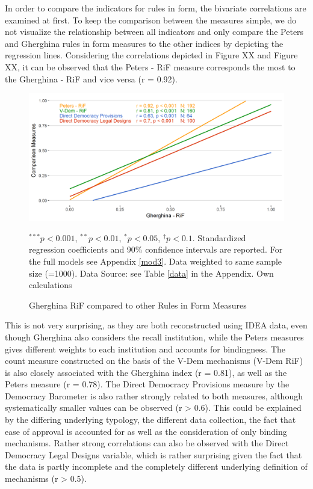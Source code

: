 \documentclass{systats}
\begin{document}
In order to compare the indicators for rules in form, the bivariate correlations are examined at first. To keep the comparison between the measures simple, we do not visualize the relationship between all indicators and only compare the Peters and Gherghina rules in form measures to the other indices by depicting the regression lines. Considering the correlations depicted in Figure XX and Figure XX, it can be observed that the Peters - RiF measure corresponds the most to the Gherghina - RiF and vice versa (r = 0.92). 

\begin{figure}
	\caption{Gherghina RiF compared to other Rules in Form Measures}
	\label{reg2}
	\includegraphics[width=\textwidth]{images/rif_ghergina.png}
	\flushright
	{\scriptsize $^{***}p<0.001$, $^{**}p<0.01$, $^*p<0.05$, $^{\dagger}p<0.1$. Standardized regression coefficients and 90\% confidence intervals are reported. For the full models see Appendix \ref{mod3}. Data weighted to same sample size (=1000). Data Source: see Table \ref{data} in the Appendix. Own calculations  \par}
\end{figure}

This is not very surprising, as they are both reconstructed using IDEA data, even though Gherghina also considers the recall institution, while the Peters measures gives different weights to each institution and accounts for bindingness. The count measure constructed on the basis of the V-Dem mechanisms (V-Dem RiF) is also closely associated with the Gherghina index (r = 0.81), as well as the Peters measure (r = 0.78). The Direct Democracy Provisions measure by the Democracy Barometer is also rather strongly related to both measures, although systematically smaller values can be observed (r > 0.6). This could be explained by the differing underlying typology, the different data collection, the fact that ease of approval is accounted for as well as the consideration of only binding mechanisms. Rather strong correlations can also be observed with the Direct Democracy Legal Designs variable, which is rather surprising given the fact that the data is partly incomplete and the completely different underlying definition of mechanisms (r > 0.5). 
\end{document}
